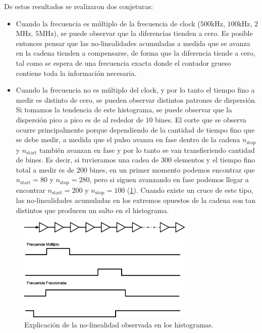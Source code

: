De estos resultados se realizaron dos conjeturas:
 \begin{itemize}
     \item Cuando la frecuencia es múltiplo de la frecuencia de clock ($500$kHz, $100$kHz, $2$MHz, $5$MHz),
     se puede observar que la diferencias tienden a cero. Es posible entonces pensar que las no-linealidades
     acumuladas a medida que se avanza en la cadena tienden a compensarse, de forma que la diferencia tiende a cero,
     tal como se espera de una frecuencia exacta donde el contador grueso contiene toda la información necesaria.
     \item Cuando la frecuencia no es múltiplo del clock, y por lo tanto el tiempo fino a medir es distinto de cero,
     se pueden observar distintos patrones de dispersión. Si tomamos la tendencia de este histograma, se puede observar
     que la dispersión pico a pico es de al rededor de $10$ bines. El corte que se observa ocurre principalmente porque 
     dependiendo de la cantidad de tiempo fino que se debe medir, a medida que el pulso avanza en fase dentro
     de la cadena $n_\text{stop}$ y $n_\text{start}$ también avanzan en fase y por lo tanto se van transfieriendo cantidad de bines.
     Es decir, si tuvieramos una cadea de $300$ elementos y el tiempo fino total a medir es de $200$ bines, en un primer momento podemos encontrar que $n_\text{start} = 80$
     y $n_\text{stop} = 280$, pero si siguen avanzando en fase podemos llegar a encontrar $n_\text{start} = 200$ y $n_\text{stop} = 100$ (\ref{fig: no-linealidades}).
     Cuando existe un cruce de este tipo, las no-linealidades acumuladas en los extremos opuestos de la cadena son tan distintos que
     producen un salto en el histograma.
 \end{itemize}

 \begin{figure}[H]
     \centering
     \includegraphics[width=0.75\textwidth]{imagenes/no-linealidades.eps}
     \caption{Explicación de la no-linealidad observada en los histogramas.}
     \label{fig: no-linealidades}
 \end{figure}


